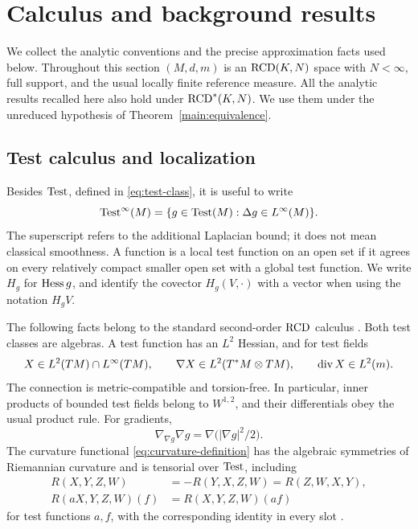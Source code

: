 \section{Calculus and background results}
\label{sec:preliminaries}

We collect the analytic conventions and the precise approximation
facts used below. Throughout this section \((M,d,m)\) is an
\(\mathrm{RCD}(K,N)\) space with \(N<\infty\), full support, and the
usual locally finite reference measure. All the analytic results
recalled here also hold under \(\mathrm{RCD}^*(K,N)\). We use them under the
unreduced hypothesis of Theorem~\ref{main:equivalence}.

\subsection{Test calculus and localization}

Besides \(\operatorname{Test}\), defined in \eqref{eq:test-class}, it is useful to
write
\[
\operatorname{Test}^\infty(M)=\{g\in\operatorname{Test}(M):\Delta g\in L^\infty(M)\}.
\]
The superscript refers to the additional Laplacian bound; it does
not mean classical smoothness. A function is a local test function
on an open set if it agrees on every relatively compact smaller
open set with a global test function. We write \(H_g\) for
\(\operatorname{Hess} g\), and identify the covector \(H_g(V,\cdot)\) with a
vector when using the notation \(H_gV\).

The following facts belong to the standard second-order
\(\mathrm{RCD}\) calculus \cite{Gigli2018,Gigli2019,Savare2014}.
Both test classes are algebras. A test function has an \(L^2\)
Hessian, and for test fields
\[
X\in L^2(TM)\cap L^\infty(TM),\qquad
\nabla X\in L^2(T^*M\otimes TM),\qquad
\operatorname{div} X\in L^2(m).
\]
The connection is metric-compatible and torsion-free. In particular,
inner products of bounded test fields belong to \(W^{1,2}\),
and their differentials obey the usual product rule.
For gradients,
\[
\nabla_{\nabla g}\nabla g=\nabla\bigl(|\nabla g|^2/2\bigr).
\]
The curvature functional \eqref{eq:curvature-definition} has the
algebraic symmetries of Riemannian curvature and is tensorial over
\(\operatorname{Test}\), including
\begin{align}
\label{eq:curvature-symmetries}
R(X,Y,Z,W)&=-R(Y,X,Z,W)=R(Z,W,X,Y),\\
\label{eq:curvature-tensoriality}
R(aX,Y,Z,W)(f)&=R(X,Y,Z,W)(af)
\end{align}
for test functions \(a,f\), with the corresponding identity in every
slot \cite[Proposition~2.7]{Gigli2019}.

